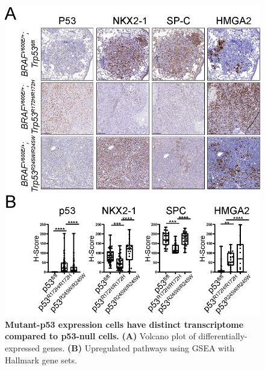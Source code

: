 \begin{figure}
\hypertarget{fig:14}{%
\centering
\includegraphics{images/p53_4.png}
\caption{\textbf{Mutant-p53 expression cells have distinct transcriptome compared to p53-null cells.} \textbf{(A)} Volcano plot of differentially-expressed genes. \textbf{(B)} Upregulated pathways using GSEA with Hallmark gene sets.}\label{fig:14}
}
\end{figure}

